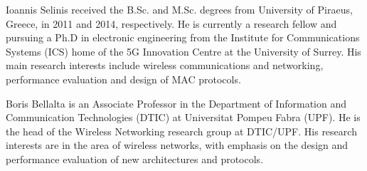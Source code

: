 \documentclass[comsoc]{IEEEtran}
\begin{document}
	\begin{IEEEbiography}{Ioannis Selinis} received the B.Sc. and M.Sc. degrees from University of Piraeus, Greece, in 2011 and 2014, respectively. He is currently a research fellow and pursuing a Ph.D in electronic engineering from the Institute for Communications Systems (ICS) home of the 5G Innovation Centre at the University of Surrey. His main research interests include wireless communications and networking, performance evaluation and design of MAC protocols.
	\end{IEEEbiography}

	\begin{IEEEbiography}{Boris Bellalta} is an Associate Professor in the Department of Information and Communication Technologies (DTIC) at Universitat Pompeu Fabra (UPF). He is the head of the Wireless Networking research group at DTIC/UPF. His research interests are in the area of wireless networks, with emphasis on the design and performance evaluation of new architectures and protocols.
	\end{IEEEbiography}

	
	
	
\end{document}
